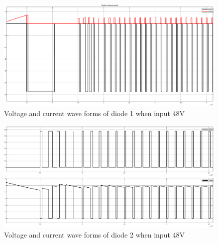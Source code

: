 \documentclass{article}
\begin{document}
\begin{figure}[H]
    \centering
    \includegraphics[scale=0.3]{diode1.png}
    \caption{Voltage and current wave forms of diode 1 when input 48V}
    \label{fig:my_label}
\end{figure}

\begin{figure}[H]
    \centering
    \includegraphics[scale=0.3]{48diode2.png}
    \caption{Voltage and current wave forms of diode 2 when input 48V}
    \label{fig:my_label}
\end{figure}
\end{document}
